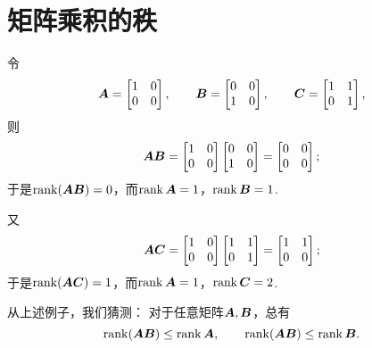 \section{矩阵乘积的秩}
令\[
	\boldsymbol{A}=\begin{bmatrix}
		1 & 0 \\
		0 & 0
	\end{bmatrix}, \qquad
	\boldsymbol{B}=\begin{bmatrix}
		0 & 0 \\
		1 & 0
	\end{bmatrix}, \qquad
	\boldsymbol{C}=\begin{bmatrix}
		1 & 1 \\
		0 & 1
	\end{bmatrix},
\]
则\[
	\boldsymbol{A} \boldsymbol{B}=\begin{bmatrix}
		1 & 0 \\
		0 & 0
	\end{bmatrix}
	\begin{bmatrix}
		0 & 0 \\
		1 & 0
	\end{bmatrix}
	= \begin{bmatrix}
		0 & 0 \\
		0 & 0
	\end{bmatrix};
\]
于是\(\rank(\boldsymbol{A} \boldsymbol{B})=0\)，而\(\rank\boldsymbol{A}=1\)，\(\rank\boldsymbol{B}=1\).

又\[
	\boldsymbol{A}\boldsymbol{C}=\begin{bmatrix}
		1 & 0 \\
		0 & 0
	\end{bmatrix}
	\begin{bmatrix}
		1 & 1 \\
		0 & 1
	\end{bmatrix}
	= \begin{bmatrix}
		1 & 1 \\
		0 & 0
	\end{bmatrix};
\]
于是\(\rank(\boldsymbol{A}\boldsymbol{C})=1\)，而\(\rank\boldsymbol{A}=1\)，\(\rank\boldsymbol{C}=2\).

从上述例子，我们猜测：
对于任意矩阵\(\boldsymbol{A},\boldsymbol{B}\)，总有\[
	\rank(\boldsymbol{A} \boldsymbol{B}) \leq \rank\boldsymbol{A}, \qquad
	\rank(\boldsymbol{A} \boldsymbol{B}) \leq \rank\boldsymbol{B}.
\]

